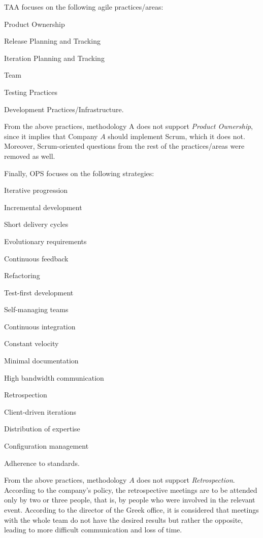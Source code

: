 \ac{TAA} focuses on the following agile practices/areas:
\begin{inparaenum} [a\upshape)]
	\item Product Ownership
	\item Release Planning and Tracking
	\item Iteration Planning and Tracking
	\item Team
	\item Testing Practices
	\item Development Practices/Infrastructure.
\end{inparaenum}
From the above practices, methodology A does not support \textit{Product Ownership}, since it implies that Company $A$ should implement Scrum, which it does not. Moreover, Scrum-oriented questions from the rest of the practices/areas were removed as well. 

Finally, \ac{OPS} focuses on the following strategies:
\begin{inparaenum} [a\upshape)]
	\item Iterative progression
	\item Incremental development
	\item Short delivery cycles
	\item Evolutionary requirements
	\item Continuous feedback
	\item Refactoring
	\item Test-first development
	\item Self-managing teams
	\item Continuous integration
	\item Constant velocity
	\item Minimal documentation
	\item High bandwidth communication
	\item Retrospection
	\item Client-driven iterations
	\item Distribution of expertise
	\item Configuration management
	\item Adherence to standards.
\end{inparaenum}

From the above practices, methodology $A$ does not support \textit{Retrospection}. According to the company's policy, the retrospective meetings are to be attended only by two or three people, that is, by people who were involved in the relevant event. According to the director of the Greek office, it is considered that meetings with the whole team do not have the desired results but rather the opposite, leading to more difficult communication and loss of time.

